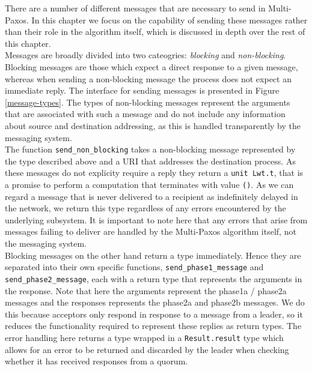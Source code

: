 There are a number of different messages that are necessary to send in Multi-Paxos. In this chapter we focus on the capability of sending these messages rather than their role in the algorithm itself, which is discussed in depth over the rest of this chapter. \\

Messages are broadly divided into two cateogries: \emph{blocking} and \emph{non-blocking}. Blocking messages are those which expect a direct response to a given message, whereas when sending a non-blocking message the process does not expect an immediate reply. The interface for sending messages is presented in Figure \ref{message-types}. The types of non-blocking messages represent the arguments that are associated with such a message and do not include any information about source and destination addressing, as this is handled transparently by the messaging system. \\

The function \texttt{send\_non\_blocking} takes a non-blocking message represented by the type described above and a URI that addresses the destination process. As these messages do not explicity require a reply they return a \texttt{unit Lwt.t}, that is a promise to perform a computation that terminates with value \texttt{()}. As we can regard a message that is never delivered to a recipient as indefinitely delayed in the network, we return this type regardless of any errors encountered by the underlying subsystem. It is important to note here that any errors that arise from messages failing to deliver are handled by the Multi-Paxos algorithm itself, not the messaging system. \\

Blocking messages on the other hand return a type immediately. Hence they are separated into their own specific functions, \texttt{send\_phase1\_message} and \texttt{send\_phase2\_message}, each with a return type that represents the arguments in the response. Note that here the arguments represent the phase1a / phase2a messages and the responses represents the phase2a and phase2b messages. We do this because acceptors only respond in response to a message from a leader, so it reduces the functionality required to represent these replies as return types. The error handling here returns a type wrapped in a \texttt{Result.result} type which allows for an error to be returned and discarded by the leader when checking whether it has received responses from a quorum. \\

